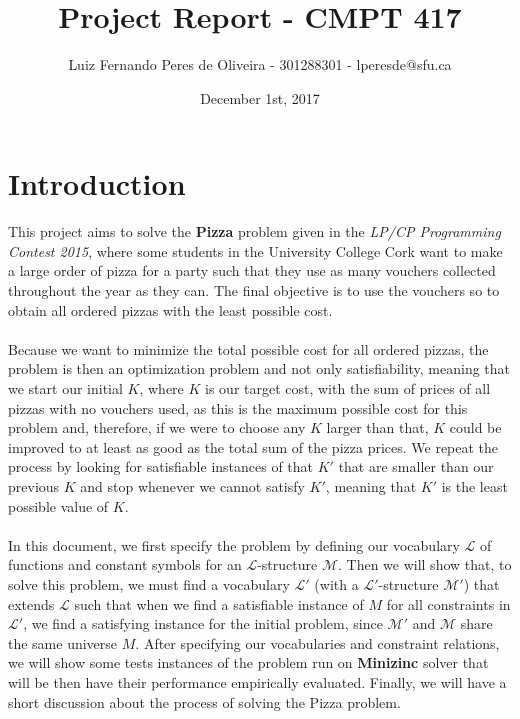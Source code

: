 \documentclass[conference]{IEEEtran}
\title{Project Report - CMPT 417}
\author{Luiz Fernando Peres de Oliveira - 301288301 - lperesde@sfu.ca}
\date{December 1st, 2017}
\newcommand\tab[1][0.3cm]{\hspace*{#1}}
\begin{document}
\maketitle
\section{Introduction}
This project aims to solve the \textbf{Pizza} problem given in the \textit{LP/CP Programming Contest 2015}, where some students in the University College Cork want to make a large order of pizza for a party such that they use as many vouchers collected throughout the year as they can. The final objective is to use the vouchers so to obtain all ordered pizzas with the least possible cost.
\\
\\
\tab Because we want to minimize the total possible cost for all ordered pizzas, the problem is then an optimization problem and not only satisfiability, meaning that we start our initial $K$, where $K$ is our target cost, with the sum of prices of all pizzas with no vouchers used, as this is the maximum possible cost for this problem and, therefore, if we were to choose any $K$ larger than that, $K$ could be improved to at least as good as the total sum of the pizza prices. We repeat the process by looking for satisfiable instances of that $K'$ that are smaller than our previous $K$ and stop whenever we cannot satisfy $K'$, meaning that $K'$ is the least possible value of $K$.
\\
\\
\tab In this document, we first specify the problem by defining our vocabulary $\mathcal{L}$ of functions and constant symbols for an $\mathcal{L}$-structure $\mathcal{M}$. Then we will show that, to solve this problem, we must find a vocabulary $\mathcal{L'}$ (with a $\mathcal{L'}$-structure $\mathcal{M'}$) that extends $\mathcal{L}$ such that when we find a satisfiable instance of $M$ for all constraints in $\mathcal{L'}$, we find a satisfying instance for the initial problem, since $\mathcal{M'}$ and $\mathcal{M}$ share the same universe $M$. After specifying our vocabularies and constraint relations, we will show some tests instances of the problem run on \textbf{Minizinc} solver that will be then have their performance empirically evaluated. Finally, we will have a short discussion about the process of solving the Pizza problem.
\end{document}
